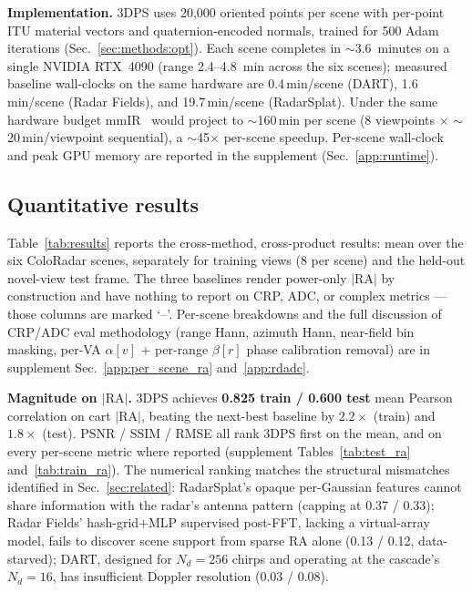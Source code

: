 \textbf{Implementation.} 3DPS uses 20{,}000 oriented points per scene with per-point ITU material vectors and quaternion-encoded normals, trained for 500 Adam iterations (Sec.~\ref{sec:methods:opt}). Each scene completes in ${\sim}$3.6~minutes on a single NVIDIA RTX~4090 (range 2.4--4.8~min across the six scenes); measured baseline wall-clocks on the same hardware are 0.4\,min/scene (DART), 1.6\,min/scene (Radar Fields), and 19.7\,min/scene (RadarSplat). Under the same hardware budget mmIR~\cite{mmIR2026} would project to ${\sim}$160\,min per scene (8 viewpoints $\times$ ${\sim}$20\,min/viewpoint sequential), a ${\sim}$45$\times$ per-scene speedup. Per-scene wall-clock and peak GPU memory are reported in the supplement (Sec.~\ref{app:runtime}).

\subsection{Quantitative results}
\label{sec:experiments:results}

Table~\ref{tab:results} reports the cross-method, cross-product results: mean over the six ColoRadar scenes, separately for training views (8 per scene) and the held-out novel-view test frame. The three baselines render power-only $|\mathrm{RA}|$ by construction and have nothing to report on CRP, ADC, or complex metrics --- those columns are marked `--'. Per-scene breakdowns and the full discussion of CRP/ADC eval methodology (range Hann, azimuth Hann, near-field bin masking, per-VA $\alpha[v]$ + per-range $\beta[r]$ phase calibration removal) are in supplement Sec.~\ref{app:per_scene_ra} and~\ref{app:rdadc}.



\textbf{Magnitude on $|\mathrm{RA}|$.} 3DPS achieves \textbf{0.825 train / 0.600 test} mean Pearson correlation on cart $|\mathrm{RA}|$, beating the next-best baseline by $2.2\!\times$ (train) and $1.8\!\times$ (test). PSNR / SSIM / RMSE all rank 3DPS first on the mean, and on every per-scene metric where reported (supplement Tables~\ref{tab:test_ra} and~\ref{tab:train_ra}). The numerical ranking matches the structural mismatches identified in Sec.~\ref{sec:related}: RadarSplat's opaque per-Gaussian features cannot share information with the radar's antenna pattern (capping at 0.37 / 0.33); Radar Fields' hash-grid+MLP supervised post-FFT, lacking a virtual-array model, fails to discover scene support from sparse RA alone (0.13 / 0.12, data-starved); DART, designed for $N_d{=}256$ chirps and operating at the cascade's $N_d{=}16$, has insufficient Doppler resolution (0.03 / 0.08).

